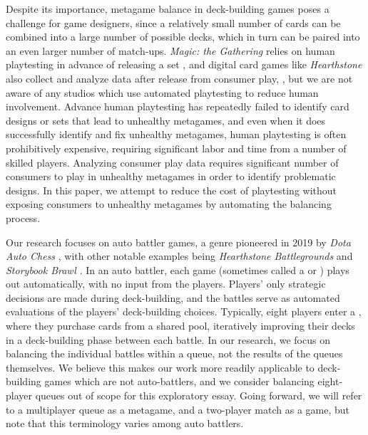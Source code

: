 
Despite its importance, metagame balance in deck-building games poses
a challenge for game designers, since a relatively small number of
cards can be combined into a large number of possible decks, which in
turn can be paired into an even larger number of
match-ups. \textit{Magic: the Gathering} relies on human playtesting
in advance of releasing a set \cite{designing-hod-ffl}, and digital
card games like \textit{Hearthstone} also collect and analyze data
after release from consumer play,
\cite{blizzard-gamebalancetalk-keg2019}, but we are not aware of any
studios which use automated playtesting to reduce human involvement.
Advance human playtesting has repeatedly failed to identify card
designs or sets that lead to unhealthy metagames, and even when it
does successfully identify and fix unhealthy metagames, human
playtesting is often prohibitively expensive, requiring significant
labor and time from a number of skilled players. Analyzing consumer
play data requires significant number of consumers to play in
unhealthy metagames in order to identify problematic designs.
In this paper, we attempt to reduce the cost of playtesting without
exposing consumers to unhealthy metagames by automating the balancing
process.

Our research focuses on auto battler games, a genre pioneered in 2019
by \textit{Dota Auto Chess} \cite{autochess}, with other notable
examples being \textit{Hearthstone Battlegrounds}
\cite{hearthstone-battlegrounds} and \textit{Storybook Brawl}
\cite{storybook-brawl}.
In an auto battler, each game (sometimes called a  or
) plays out automatically, with no input from the
players. Players' only strategic decisions are made during
deck-building, and the battles serve as automated evaluations of the
players' deck-building choices. Typically, eight players enter a
, where they purchase cards from a shared pool,
iteratively improving their decks in a deck-building phase between
each battle. In our research, we focus on balancing the individual
battles within a queue, not the results of the queues themselves. We
believe this makes our work more readily applicable to deck-building
games which are not auto-battlers, and we consider balancing
eight-player queues out of scope for this exploratory essay.  Going
forward, we will refer to a multiplayer queue as a metagame, and a
two-player match as a game, but note that this terminology varies
among auto battlers.

